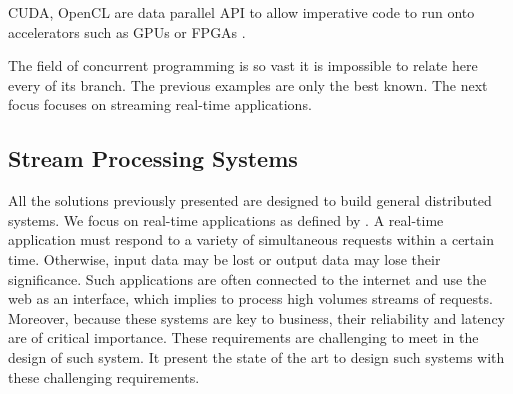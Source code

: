 CUDA, OpenCL are data parallel API to allow imperative code to run onto accelerators such as GPUs or FPGAs \cite{Stone2010}.

The field of concurrent programming is so vast it is impossible to relate here every of its branch.
The previous examples are only the best known.
The next focus focuses on streaming real-time applications.

\subsection{Stream Processing Systems} \label{chapter3:parallel-execution:stream-processing}

All the solutions previously presented are designed to build general distributed systems.
We focus on real-time applications as defined by \cite{Hansen1978}.
A real-time application must respond to a variety of simultaneous requests within a certain time.
Otherwise, input data may be lost or output data may lose their significance.
Such applications are often connected to the internet and use the web as an interface, which implies to process high volumes streams of requests.
Moreover, because these systems are key to business, their reliability and latency are of critical importance.
These requirements are challenging to meet in the design of such system.
It present the state of the art to design such systems with these challenging requirements.



